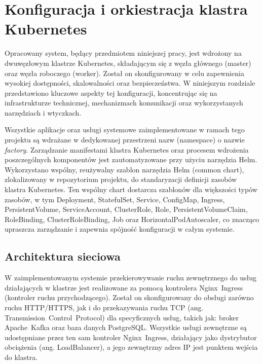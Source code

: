 \section{Konfiguracja i orkiestracja klastra Kubernetes}
\label{chap:konfiguracja_kubernetes}

Opracowany system, będący przedmiotem niniejszej pracy, jest wdrożony na dwuwęzłowym klastrze Kubernetes, składającym się z węzła głównego (master) oraz węzła roboczego (worker). Został on skonfigurowany w celu zapewnienia wysokiej dostępności, skalowalności oraz bezpieczeństwa. W niniejszym rozdziale przedstawiono kluczowe aspekty tej konfiguracji, koncentrując się na infrastrukturze technicznej, mechanizmach komunikacji oraz wykorzystanych narzędziach i wtyczkach.

Wszystkie aplikacje oraz usługi systemowe zaimplementowane w ramach tego projektu są wdrażane w dedykowanej przestrzeni nazw (namespace) o nazwie \textit{factory}. Zarządzanie manifestami klastra Kubernetes oraz procesem wdrożenia poszczególnych komponentów jest zautomatyzowane przy użyciu narzędzia Helm. Wykorzystano wspólny, reużywalny szablon narzędzia Helm (common chart), zlokalizowany w repozytorium projektu, do standaryzacji definicji zasobów klastra Kubernetes. Ten wspólny chart dostarcza szablonów dla większości typów zasobów, w tym \mbox{Deployment}, \mbox{StatefulSet}, \mbox{Service}, \mbox{ConfigMap}, \mbox{Ingress}, \mbox{PersistentVolume},  \mbox{ServiceAccount}, \mbox{ClusterRole},  \mbox{Role}, \mbox{PersistentVolumeClaim},   \mbox{RoleBinding},   \mbox{ClusterRoleBinding}, \mbox{Job} oraz \mbox{HorizontalPodAutoscaler}, co znacząco upraszcza zarządzanie i zapewnia spójność konfiguracji w całym systemie.

\subsection{Architektura sieciowa}

W zaimplementowanym systemie przekierowywanie ruchu zewnętrznego do usług działających w klastrze jest realizowane za pomocą kontrolera \mbox{Nginx Ingress} (kontroler ruchu przychodzącego). Został on skonfigurowany do obsługi zarówno ruchu \mbox{HTTP/HTTPS}, jak i do przekazywania ruchu TCP (ang. \mbox{Transmission Control Protocol}) \cite{tanenbaum2011computer} dla specyficznych usług, takich jak: broker \mbox{Apache Kafka} oraz baza danych \mbox{PostgreSQL}. Wszystkie usługi zewnętrzne są udostępniane przez ten sam kontroler \mbox{Nginx Ingress}, działający jako dystrybutor obciążenia (ang. \mbox{LoadBalancer}), a jego zewnętrzny adres IP jest punktem wejścia do klastra.

